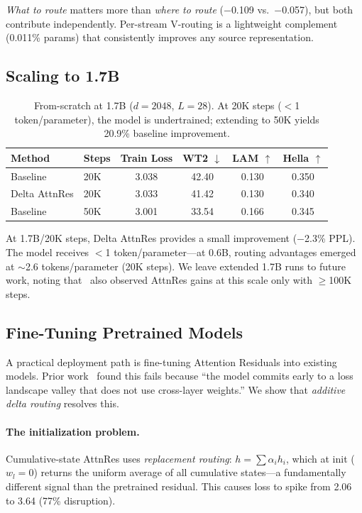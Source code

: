 \documentclass{article}
\begin{document}
\emph{What to route} matters more than \emph{where to route} ($-$0.109 vs.\ $-$0.057), but both contribute independently. Per-stream V-routing is a lightweight complement (0.011\% params) that consistently improves any source representation.

\subsection{Scaling to 1.7B}

\begin{table}[h]
\centering
\caption{From-scratch at 1.7B ($d{=}2048$, $L{=}28$). At 20K steps ($<$1 token/parameter), the model is undertrained; extending to 50K yields 20.9\% baseline improvement.}
\label{tab:scratch_1.7b}
\begin{tabular}{llcccc}
\toprule
\textbf{Method} & \textbf{Steps} & \textbf{Train Loss} & \textbf{WT2 $\downarrow$} & \textbf{LAM $\uparrow$} & \textbf{Hella $\uparrow$} \\
\midrule
Baseline & 20K & 3.038 & 42.40 & 0.130 & 0.350 \\
Delta AttnRes & 20K & 3.033 & 41.42 & 0.130 & 0.340 \\
\midrule
Baseline & 50K & 3.001 & 33.54 & 0.166 & 0.345 \\
\bottomrule
\end{tabular}
\end{table}

At 1.7B/20K steps, Delta AttnRes provides a small improvement ($-$2.3\% PPL). The model receives $<$1 token/parameter---at 0.6B, routing advantages emerged at ${\sim}$2.6 tokens/parameter (20K steps). We leave extended 1.7B runs to future work, noting that~\citet{kimi2025attention} also observed AttnRes gains at this scale only with ${\geq}$100K steps.

\subsection{Fine-Tuning Pretrained Models}
\label{sec:finetune}

A practical deployment path is fine-tuning Attention Residuals into existing models. Prior work~\citep{pagliardini2024denseformer} found this fails because ``the model commits early to a loss landscape valley that does not use cross-layer weights.'' We show that \emph{additive delta routing} resolves this.

\paragraph{The initialization problem.} Cumulative-state AttnRes uses \emph{replacement routing}: $h = \sum \alpha_i h_i$, which at init ($w_l = 0$) returns the uniform average of all cumulative states---a fundamentally different signal than the pretrained residual. This causes loss to spike from 2.06 to 3.64 (77\% disruption).
\end{document}
